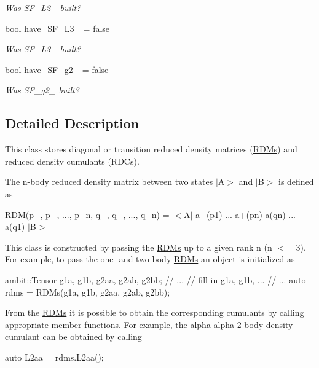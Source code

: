 \begin{DoxyCompactItemize}
\begin{DoxyCompactList}\small\item\em Was S\+F\+\_\+\+L2\+\_\+ built? \end{DoxyCompactList}\item 
bool \mbox{\hyperlink{classforte_1_1_r_d_ms_a0751bd68f0be09b18d60e8ac22bbb842}{have\+\_\+\+S\+F\+\_\+\+L3\+\_\+}} = false
\begin{DoxyCompactList}\small\item\em Was S\+F\+\_\+\+L3\+\_\+ built? \end{DoxyCompactList}\item 
bool \mbox{\hyperlink{classforte_1_1_r_d_ms_a4ee57cfe32b776f774ab82b465d5efe2}{have\+\_\+\+S\+F\+\_\+g2\+\_\+}} = false
\begin{DoxyCompactList}\small\item\em Was S\+F\+\_\+g2\+\_\+ built? \end{DoxyCompactList}\end{DoxyCompactItemize}


\subsection{Detailed Description}
This class stores diagonal or transition reduced density matrices (\mbox{\hyperlink{classforte_1_1_r_d_ms}{R\+D\+Ms}}) and reduced density cumulants (R\+D\+Cs). 

The n-\/body reduced density matrix between two states $\vert$A$>$ and $\vert$B$>$ is defined as

R\+DM(p\+\_, p\+\_, ..., p\+\_\+n, q\+\_, q\+\_, ..., q\+\_\+n) = $<$A$\vert$ a+(p1) ... a+(pn) a(qn) ... a(q1) $\vert$B$>$

This class is constructed by passing the \mbox{\hyperlink{classforte_1_1_r_d_ms}{R\+D\+Ms}} up to a given rank n (n $<$= 3). For example, to pass the one-\/ and two-\/body \mbox{\hyperlink{classforte_1_1_r_d_ms}{R\+D\+Ms}} an object is initialized as

ambit\+::\+Tensor g1a, g1b, g2aa, g2ab, g2bb; // ... // fill in g1a, g1b, ... // ... auto rdms = R\+D\+Ms(g1a, g1b, g2aa, g2ab, g2bb);

From the \mbox{\hyperlink{classforte_1_1_r_d_ms}{R\+D\+Ms}} it is possible to obtain the corresponding cumulants by calling appropriate member functions. For example, the alpha-\/alpha 2-\/body density cumulant can be obtained by calling

auto L2aa = rdms.\+L2aa();

